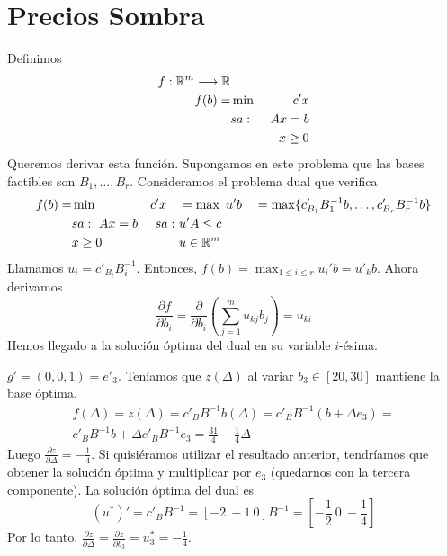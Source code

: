 \documentclass[PM.tex]{subfiles}
\begin{document}
\section{Precios Sombra}
Definimos 
\begin{align*}
f:\mathbb{R}^m\longrightarrow \mathbb{R} & & &\\
 f(b) = & \min\ & c'x\\
                                &sa:\  & Ax=b\\
       							& & x\geq 0
\end{align*}
Queremos derivar esta función. Supongamos en este problema que las bases factibles son $B_1,\dots, B_r$. Consideramos el problema dual que verifica
\begin{align*}
 f(b) = & \min\ & c'x\quad  & =\max\ u'b \quad  = \max\{c'_{B_1}B_1^{-1}b,\dots, c'_{B_r}B_r^{-1}b\}\\
        &sa:\   Ax=b       &sa:\ & u'A\leq c\\
        &  x\geq 0         & & u\in\mathbb{R}^m 
\end{align*}
Llamamos $u_i=c'_{B_i}B_i^{-1}$. Entonces, $f(b)=\max_{1\leq i\leq r}u_i'b=u'_k b$. Ahora derivamos
\[\frac{\partial f}{\partial b_i}=\frac{\partial }{\partial b_i}\left(\sum_{j=1}^m u_{kj}b_j\right)=u_{ki}\]
Hemos llegado a la solución óptima del dual en su variable $i$-ésima. 
\begin{example}
$g'=(0,0,1)=e'_3$. Teníamos que $z(\Delta)$ al variar $b_3\in [20,30]$ mantiene la base óptima.
\begin{gather*}
f(\Delta)= z(\Delta)=c'_B B^{-1}b(\Delta)=c'_B B^{-1}(b+\Delta e_3)=\\
c'_B B^{-1} b +\Delta c'_B B^{-1} e_3 =\frac{31}{4}-\frac{1}{4}\Delta
\end{gather*}
Luego $\frac{\partial z}{\partial\Delta}=-\frac{1}{4}$. Si quisiéramos utilizar el resultado anterior, tendríamos que obtener la solución óptima y multiplicar por $e_3$ (quedarnos con la tercera componente). La solución óptima del dual es
\[(u^*)'=c'_B B^{-1}=[-2\ -1\ 0]B^{-1}=[-\frac{1}{2}\ 0\ -\frac{1}{4}]\]
Por lo tanto. $\frac{\partial z}{\partial\Delta}=\frac{\partial z}{\partial b_3}=u^*_3=-\frac{1}{4}$.
\end{example}
\newpage
\end{document}
